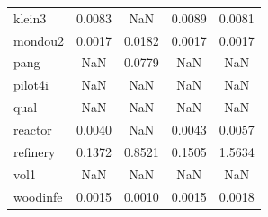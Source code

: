 \begin{longtable}{lcccc}
klein3   &   0.0083 &    NaN &   0.0089 &   0.0081 \\
mondou2  &   0.0017 & 0.0182 &   0.0017 &   0.0017 \\
pang     &      NaN & 0.0779 &      NaN &      NaN \\
pilot4i  &      NaN &    NaN &      NaN &      NaN \\
qual     &      NaN &    NaN &      NaN &      NaN \\
reactor  &   0.0040 &    NaN &   0.0043 &   0.0057 \\
refinery &   0.1372 & 0.8521 &   0.1505 &   1.5634 \\
vol1     &      NaN &    NaN &      NaN &      NaN \\
woodinfe &   0.0015 & 0.0010 &   0.0015 &   0.0018 \\
\end{longtable}
